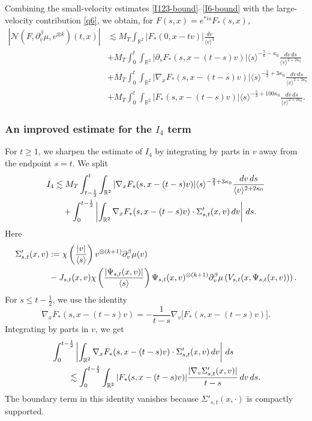 \documentclass[reqno,11pt]{amsart}
\numberwithin{equation}{section}
\begin{document}
	Combining the small-velocity estimates \eqref{I123-bound}--\eqref{I6-bound} with the
	large-velocity contribution \eqref{q6}, we obtain, for
	$F(s,x)=e^{\ast is}F_*(s,x)$,
	\begin{equation}\label{q21}
	\begin{split}
		\left|\mathcal N(F,\partial_v^\beta\mu,v^{\otimes k})(t,x)\right|
		&\lesssim M_T\int_{\mathbb R^2}
		|F_*(0,x-tv)|\frac{dv}{\langle v\rangle^3}\\
		&+M_T\int_0^t\int_{\mathbb R^2}
		|\partial_sF_*(s,x-(t-s)v)|\langle s\rangle^{-\frac76-\kappa_0}
		\frac{dv\,ds}{\langle v\rangle^{2+2\kappa_0}}\\
		&+M_T\int_0^t\int_{\mathbb R^2}|\nabla_xF_*(s,x-(t-s)v)|\langle s\rangle^{-\frac23+3\kappa_0}
		\frac{dv\,ds}{\langle v\rangle^{2+2\kappa_0}}\\
		&+M_T\int_0^t\int_{\mathbb R^2}
		|F_*(s,x-(t-s)v)|\langle s\rangle^{-\frac53+100\kappa_0}
		\frac{dv\,ds}{\langle v\rangle^{2+2\kappa_0}}.
	\end{split}
	\end{equation}
	
\subsubsection{An improved estimate for the $I_4$ term} For $t\geq1$, we sharpen the estimate of $I_4$ by integrating by parts
in $v$ away from the endpoint $s=t$. We split	
\begin{align}
		I_4&\lesssim M_T\int_{t-\frac12}^t\int_{\mathbb R^2}
		|\nabla_xF_*(s,x-(t-s)v)|\langle s\rangle^{-\frac23+3\kappa_0}
		\frac{dv\,ds}{\langle v\rangle^{2+2\kappa_0}}\notag\\
		&\quad+\int_0^{t-\frac12}
		\left|\int_{\mathbb R^2}
		\nabla_xF_*(s,x-(t-s)v)\cdot
		\Sigma'_{s,t}(x,v)\,dv
		\right|\,ds.
		\label{I4-split}
	\end{align}
	Here
	\begin{align}
		\Sigma'_{s,t}(x,v)&:=
		\chi\left(\frac{|v|}{\langle s\rangle}\right)
		v^{\otimes(k+1)}
		\partial_v^\beta\mu(v)
		\notag\\
		&-J_{s,t}(x,v)
		\chi\left(\frac{|\Psi_{s,t}(x,v)|}{\langle s\rangle}\right)
		\Psi_{s,t}(x,v)^{\otimes(k+1)}
		\partial_v^\beta\mu
		\left(
		V_{s,t}(x,\Psi_{s,t}(x,v))
		\right).
		\label{Sigma-prime-def}
	\end{align}
	For $s\le t-\frac12$, we use the identity
	\begin{equation*}
		\nabla_xF_*(s,x-(t-s)v)=-\frac{1}{t-s}
		\nabla_v\bigl[F_*(s,x-(t-s)v)\bigr].
	\end{equation*}
	Integrating by parts in $v$, we get
	\begin{align}
		&\int_0^{t-\frac12}\left|
		\int_{\mathbb R^2}
		\nabla_xF_*(s,x-(t-s)v)\cdot
		\Sigma'_{s,t}(x,v)\,dv\right|\,ds
		\notag\\
		&\qquad\lesssim
		\int_0^{t-\frac12}
		\int_{\mathbb R^2}
		|F_*(s,x-(t-s)v)|
		\frac{|\nabla_v\Sigma'_{s,t}(x,v)|}{t-s}\,dv\,ds .
		\label{I4-ibp-v}
	\end{align}
	The boundary term in this identity vanishes because $\Sigma'_{s,t}(x,\cdot)$ is compactly supported. 
	
\end{document}
